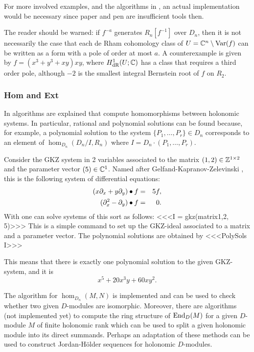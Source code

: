 For more involved examples, and the algorithms in \cite{DM:W4}, an
actual implementation would be  necessary since paper and pen are
insufficient tools then.
\begin{remark}
The reader should be warned: if $f^{-a}$ generates $R_n[f^{-1}]$ over
$D_n$, then it is not necessarily the case that each de Rham
cohomology class of $U={\mathbb C}^n\setminus\operatorname{Var}(f)$ can be written as a form
with a pole of order at most $a$. A counterexample is given by
$f=(x^3+y^3+xy)xy$, where $H^1_{{\rm dR}}(U;{\mathbb C})$ has a class that requires a
third order pole, although $-2$ is the smallest integral Bernstein root
of $f$ on $R_2$.
\end{remark}

\subsubsection{Hom and Ext}
In \cite{DM:O-T-T,DM:Ts0,DM:T-W} algorithms are explained that compute homomorphisms
between holonomic systems. In particular, rational and polynomial
solutions can be found because, for example, a polynomial solution to the system
$\{P_1,\ldots,P_r\}\in D_n$ corresponds to an element of
$\hom_{D_n}(D_n/I,R_n)$ where $I=D_n\cdot(P_1,\ldots,P_r)$.
\begin{example}
Consider the GKZ system in 2 variables associated to the matrix
$(1,2)\in {\mathbb Z}^{1\times 2}$ and the parameter vector $(5)\in{\mathbb C}^1$. 
Named after
Gelfand-Kapranov-Zelevinski \cite{DM:GKZ}, this 
is the following system of
differential equations:
\begin{eqnarray*}
(x\partial_x+y\partial_y)\bullet f&=&5f,\\
(\partial_x^2-\partial_y)\bullet f&=&0.
\end{eqnarray*}
With \Mtwo one can solve systems of this sort as follows:
<<<I = gkz(matrix{{1,2}}, {5})>>>
This is a simple command to set up the GKZ-ideal associated to a
matrix and a parameter vector. The polynomial solutions are obtained
by
<<<PolySols I>>>

This means that there is exactly one polynomial solution to the given
GKZ-system, and it is 
\[
x^5+20x^3y+60xy^2.
\]
\end{example}
The algorithm for $\hom_{D_n}(M,N)$ is implemented and
can be used to check whether two given $D$-modules are
isomorphic. 
Moreover, there are algorithms (not implemented yet) 
to compute the ring structure of
$\operatorname{End}_D(M)$ for a given $D$-module $M$ of finite holonomic
rank which can be used to split a given holonomic module into its
direct summands. 
Perhaps an adaptation of these methods can be used to construct
Jordan-H\"older sequences for holonomic $D$-modules.

